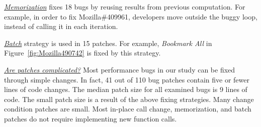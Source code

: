 \underline{\it Memorization} fixes 18 bugs by reusing results 
from previous computation. 
For example, in order to fix Mozilla\#409961, 
developers move  outside the buggy loop, instead of calling it in each iteration.  

\underline{\it Batch} strategy is used in 15 patches. 
For example, {\it Bookmark All} in Figure~\ref{fig:Mozilla490742} is fixed by this strategy.   

\underline{\it Are patches complicated?}
Most performance bugs in our study can be fixed through simple changes. 
In fact, 41 out of 110 bug patches contain five or fewer lines of code changes. 
The median patch size for all examined bugs is 9 lines of code.
The small patch size is a result of the above fixing strategies.
Many change condition patches are small. 
Most in-place call change, memorization, and batch patches do not require implementing new function calls.


